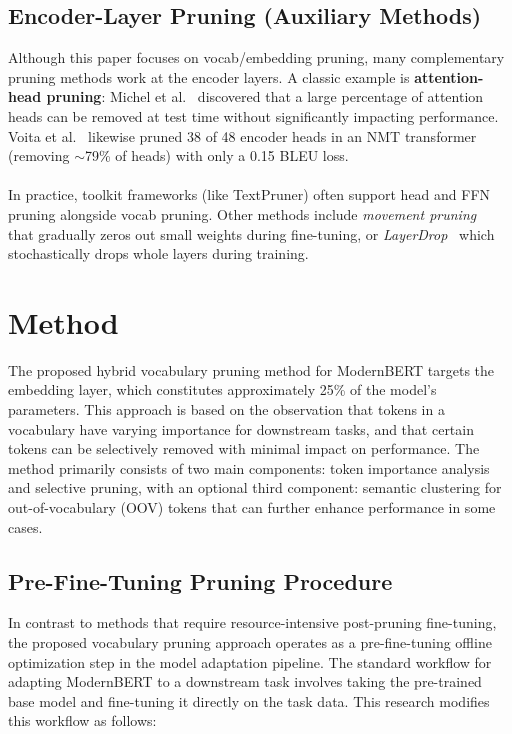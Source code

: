 \documentclass[twocolumn]{article}
\begin{document}
\subsection{Encoder-Layer Pruning (Auxiliary Methods)}
Although this paper focuses on vocab/embedding pruning, many complementary pruning methods work at the encoder layers. A classic example is \textbf{attention-head pruning}: Michel et al.~\cite{michel2019sixteen} discovered that a large percentage of attention heads can be removed at test time without significantly impacting performance. Voita et al.~\cite{voita2019analyzing} likewise pruned 38 of 48 encoder heads in an NMT transformer (removing $\sim$79\% of heads) with only a 0.15 BLEU loss.
\\ \\
In practice, toolkit frameworks (like TextPruner) often support head and FFN pruning alongside vocab pruning. Other methods include \textit{movement pruning}~\cite{sanh2020movement} that gradually zeros out small weights during fine-tuning, or \textit{LayerDrop}~\cite{fan2020layerdrop} which stochastically drops whole layers during training.

\section{Method}

The proposed hybrid vocabulary pruning method for ModernBERT targets the embedding layer, which constitutes approximately 25\% of the model's parameters. This approach is based on the observation that tokens in a vocabulary have varying importance for downstream tasks, and that certain tokens can be selectively removed with minimal impact on performance. The method primarily consists of two main components: token importance analysis and selective pruning, with an optional third component: semantic clustering for out-of-vocabulary (OOV) tokens that can further enhance performance in some cases.

\subsection{Pre-Fine-Tuning Pruning Procedure}
In contrast to methods that require resource-intensive post-pruning fine-tuning, the proposed vocabulary pruning approach operates as a pre-fine-tuning offline optimization step in the model adaptation pipeline. The standard workflow for adapting ModernBERT to a downstream task involves taking the pre-trained base model and fine-tuning it directly on the task data. This research modifies this workflow as follows:
\end{document}
